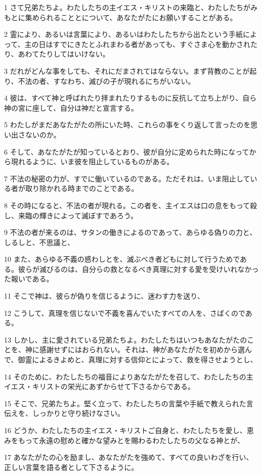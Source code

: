 \par 1 さて兄弟たちよ。わたしたちの主イエス・キリストの来臨と、わたしたちがみもとに集められることとについて、あなたがたにお願いすることがある。
\par 2 霊により、あるいは言葉により、あるいはわたしたちから出たという手紙によって、主の日はすでにきたとふれまわる者があっても、すぐさま心を動かされたり、あわてたりしてはいけない。
\par 3 だれがどんな事をしても、それにだまされてはならない。まず背教のことが起り、不法の者、すなわち、滅びの子が現れるにちがいない。
\par 4 彼は、すべて神と呼ばれたり拝まれたりするものに反抗して立ち上がり、自ら神の宮に座して、自分は神だと宣言する。
\par 5 わたしがまだあなたがたの所にいた時、これらの事をくり返して言ったのを思い出さないのか。
\par 6 そして、あなたがたが知っているとおり、彼が自分に定められた時になってから現れるように、いま彼を阻止しているものがある。
\par 7 不法の秘密の力が、すでに働いているのである。ただそれは、いま阻止している者が取り除かれる時までのことである。
\par 8 その時になると、不法の者が現れる。この者を、主イエスは口の息をもって殺し、来臨の輝きによって滅ぼすであろう。
\par 9 不法の者が来るのは、サタンの働きによるのであって、あらゆる偽りの力と、しるしと、不思議と、
\par 10 また、あらゆる不義の惑わしとを、滅ぶべき者どもに対して行うためである。彼らが滅びるのは、自分らの救となるべき真理に対する愛を受けいれなかった報いである。
\par 11 そこで神は、彼らが偽りを信じるように、迷わす力を送り、
\par 12 こうして、真理を信じないで不義を喜んでいたすべての人を、さばくのである。
\par 13 しかし、主に愛されている兄弟たちよ。わたしたちはいつもあなたがたのことを、神に感謝せずにはおられない。それは、神があなたがたを初めから選んで、御霊によるきよめと、真理に対する信仰とによって、救を得させようとし、
\par 14 そのために、わたしたちの福音によりあなたがたを召して、わたしたちの主イエス・キリストの栄光にあずからせて下さるからである。
\par 15 そこで、兄弟たちよ。堅く立って、わたしたちの言葉や手紙で教えられた言伝えを、しっかりと守り続けなさい。
\par 16 どうか、わたしたちの主イエス・キリストご自身と、わたしたちを愛し、恵みをもって永遠の慰めと確かな望みとを賜わるわたしたちの父なる神とが、
\par 17 あなたがたの心を励まし、あなたがたを強めて、すべての良いわざを行い、正しい言葉を語る者として下さるように。

